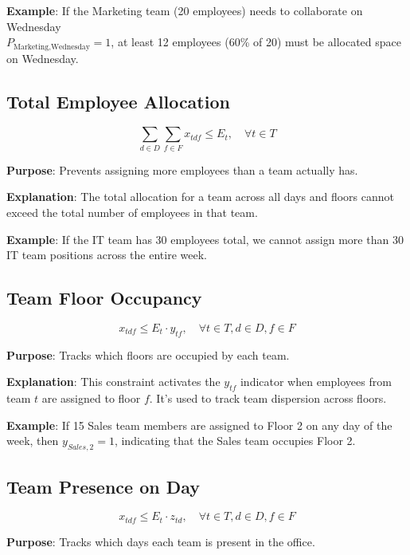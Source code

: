 \documentclass[12pt]{article}
\begin{document}
\textbf{Example}:
If the Marketing team (20 employees) needs to collaborate on Wednesday \\
\(P_{\text{Marketing},\text{Wednesday}} = 1\), at least 12 employees (60\% of 20) must be allocated space on Wednesday.

\subsection{Total Employee Allocation}
\begin{equation}
\sum_{d \in D} \sum_{f \in F} x_{tdf} \leq E_t, \quad \forall t \in T
\end{equation}

\textbf{Purpose}: Prevents assigning more employees than a team actually has.

\textbf{Explanation}: The total allocation for a team across all days and floors cannot exceed the total number of employees in that team.

\textbf{Example}: If the IT team has 30 employees total, we cannot assign more than 30 IT team positions across the entire week.

\subsection{Team Floor Occupancy}
\begin{equation}
x_{tdf} \leq E_t \cdot y_{tf}, \quad \forall t \in T, d \in D, f \in F
\end{equation}

\textbf{Purpose}: Tracks which floors are occupied by each team.

\textbf{Explanation}: This constraint activates the $y_{tf}$ indicator when employees from team $t$ are assigned to floor $f$. It's used to track team dispersion across floors.

\textbf{Example}: If 15 Sales team members are assigned to Floor 2 on any day of the week, then $y_{Sales,2} = 1$, indicating that the Sales team occupies Floor 2.

\subsection{Team Presence on Day}
\begin{equation}
x_{tdf} \leq E_t \cdot z_{td}, \quad \forall t \in T, d \in D, f \in F
\end{equation}

\textbf{Purpose}: Tracks which days each team is present in the office.
\end{document}
